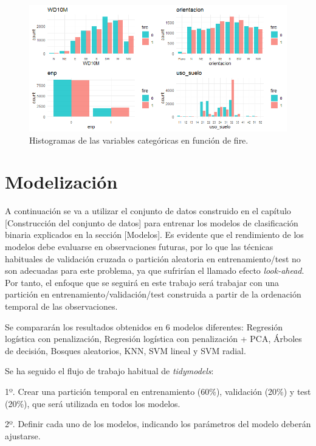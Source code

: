 \documentclass[12pt,a4paper,]{book}
\numberwithin{dummy}{section}
\theoremstyle{ocrenumbox}
\theoremstyle{blacknumex}
\theoremstyle{blacknumbox}
\theoremstyle{ocrenum}
\theoremstyle{ocrenum}
\begin{document}
\begin{figure}[h]
\centering
\includegraphics[width =\textwidth]{graficos/histogramas.png}
\caption{Histogramas de las variables categóricas en función de fire.}
\label{fig:histogramas}
\end{figure}

\hypertarget{modelizaciuxf3n}{%
\section{Modelización}\label{modelizaciuxf3n}}

A continuación se va a utilizar el conjunto de datos construido en el
capítulo {[}Construcción del conjunto de datos{]} para entrenar los
modelos de clasificación binaria explicados en la sección {[}Modelos{]}.
Es evidente que el rendimiento de los modelos debe evaluarse en
observaciones futuras, por lo que las técnicas habituales de validación
cruzada o partición aleatoria en entrenamiento/test no son adecuadas
para este problema, ya que sufrirían el llamado efecto
\emph{look-ahead}. Por tanto, el enfoque que se seguirá en este trabajo
será trabajar con una partición en entrenamiento/validación/test
construida a partir de la ordenación temporal de las observaciones.

Se compararán los resultados obtenidos en 6 modelos diferentes:
Regresión logística con penalización, Regresión logística con
penalización + PCA, Árboles de decisión, Bosques aleatorios, KNN, SVM
lineal y SVM radial.

Se ha seguido el flujo de trabajo habitual de \emph{tidymodels}:

1º. Crear una partición temporal en entrenamiento (60\%), validación
(20\%) y test (20\%), que será utilizada en todos los modelos.

2º. Definir cada uno de los modelos, indicando los parámetros del modelo
deberán ajustarse.
\end{document}

